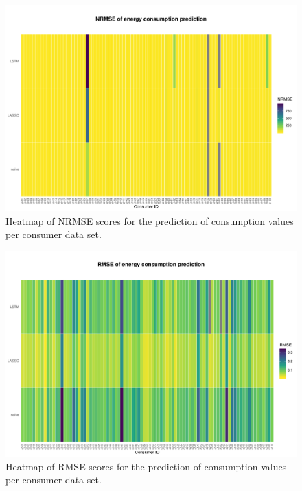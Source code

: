\begin{figure}[htbp]
 \centering
\includegraphics[width=\textwidth]{thesis/graphs/evaluation/c_heatmap_NRMSE.pdf}
\caption[Heatmap of NRMSE scores for consumption values]{Heatmap of  NRMSE scores for the prediction of consumption values per consumer data set. \quantnet\href{ }{}}
\label{Fig:heatmapNRMSE}
\end{figure}
%
\begin{figure}[htbp]
 \centering
\includegraphics[width=\textwidth]{thesis/graphs/evaluation/c_heatmap_RMSE.pdf}
\caption[Heatmap of RMSE scores for consumption values]{Heatmap of  RMSE scores for the prediction of consumption values per consumer data set. \quantnet\href{ }{}}
\label{Fig:heatmapRMSE}
\end{figure}
%

